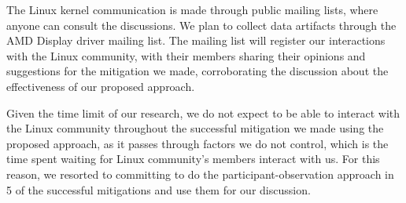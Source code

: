The Linux kernel communication is made through public mailing lists, where anyone can consult 
the discussions. We plan to collect data artifacts through the AMD Display driver mailing list. 
The mailing list will register our interactions with the Linux community, with their members 
sharing their opinions and suggestions for the mitigation we made, corroborating the discussion 
about the effectiveness of our proposed approach.

Given the time limit of our research, we do not expect to be able to interact with the Linux 
community throughout the successful mitigation we made using the proposed approach, as it passes 
through factors we do not control, which is the time spent waiting for Linux community’s members 
interact with us. For this reason, we resorted to committing to do the participant-observation 
approach in 5 of the successful mitigations and use them for our discussion.
